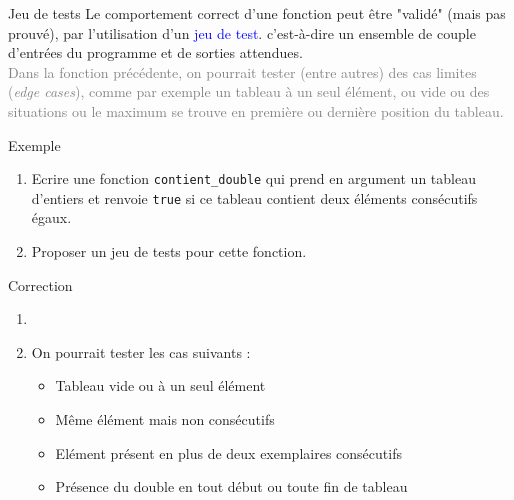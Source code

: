 \documentclass[10pt,french]{beamer}
\begin{document}
\begin{frame}{\Ctitle}{\stitle}
	\begin{block}{Jeu de tests}
		\onslide<1->Le comportement correct d'une fonction peut être "validé" (mais pas prouvé), par l'utilisation d'un \textcolor{blue}{jeu de test}. c'est-à-dire un ensemble de couple d'entrées du programme et de sorties attendues. \\
		\onslide<2->\textcolor{gray}{Dans la fonction précédente, on pourrait tester (entre autres) des cas limites (\textit{edge cases}), comme par exemple un tableau à un seul élément, ou vide ou des situations ou le maximum se trouve en première ou dernière position du tableau.}
	\end{block}
	\begin{exampleblock}{Exemple}
		\begin{enumerate}
		\item<3-> Ecrire une fonction {\tt contient\_double} qui prend en argument un tableau d'entiers et renvoie {\tt true} si ce tableau contient deux éléments consécutifs égaux.
		\item<4-> Proposer un jeu de tests pour cette fonction.
		\end{enumerate}
	\end{exampleblock}
\end{frame}


\begin{frame}{\Ctitle}{\stitle}
	\begin{exampleblock}{Correction}
		\begin{enumerate}
		\item<1-> \ \\ 
		\item<2-> On pourrait tester les cas suivants :
		\begin{itemize}
			\item<3-> Tableau vide ou à un seul élément
			\item<4-> Même élément mais non consécutifs
			\item<5-> Elément présent en plus de deux exemplaires consécutifs
			\item<6-> Présence du double en tout début ou toute fin de tableau
		\end{itemize}
		\end{enumerate}
	\end{exampleblock}
\end{frame}
\end{document}

